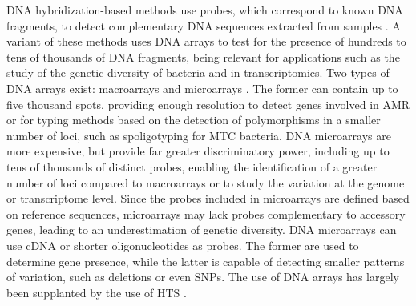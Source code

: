 \ac{DNA} hybridization-based methods use probes, which correspond to known \ac{DNA} fragments, to detect complementary \ac{DNA} sequences extracted from samples \cite{freeman_fundamentals_2000}. A variant of these methods uses \ac{DNA} arrays to test for the presence of hundreds to tens of thousands of \ac{DNA} fragments, being relevant for applications such as the study of the genetic diversity of bacteria and in transcriptomics. Two types of \ac{DNA} arrays exist: macroarrays \cite{gress_hybridization_1992, lennon_hybridization_1991} and microarrays \cite{derisi_use_1996, schena_quantitative_1995, shalon_dna_1996}. The former can contain up to five thousand spots, providing enough resolution to detect genes involved in \ac{AMR} or for typing methods based on the detection of polymorphisms in a smaller number of loci, such as spoligotyping for \ac{MTC} bacteria. \ac{DNA} microarrays are more expensive, but provide far greater discriminatory power, including up to tens of thousands of distinct probes, enabling the identification of a greater number of loci compared to macroarrays or to study the variation at the genome or transcriptome level. Since the probes included in microarrays are defined based on reference sequences, microarrays may lack probes complementary to accessory genes, leading to an underestimation of genetic diversity. \ac{DNA} microarrays can use \ac{cDNA} or shorter oligonucleotides as probes. The former are used to determine gene presence, while the latter is capable of detecting smaller patterns of variation, such as deletions or even \ac{SNPs}. The use of \ac{DNA} arrays has largely been supplanted by the use of \ac{HTS} \cite{bumgarner_dna_2013}.

